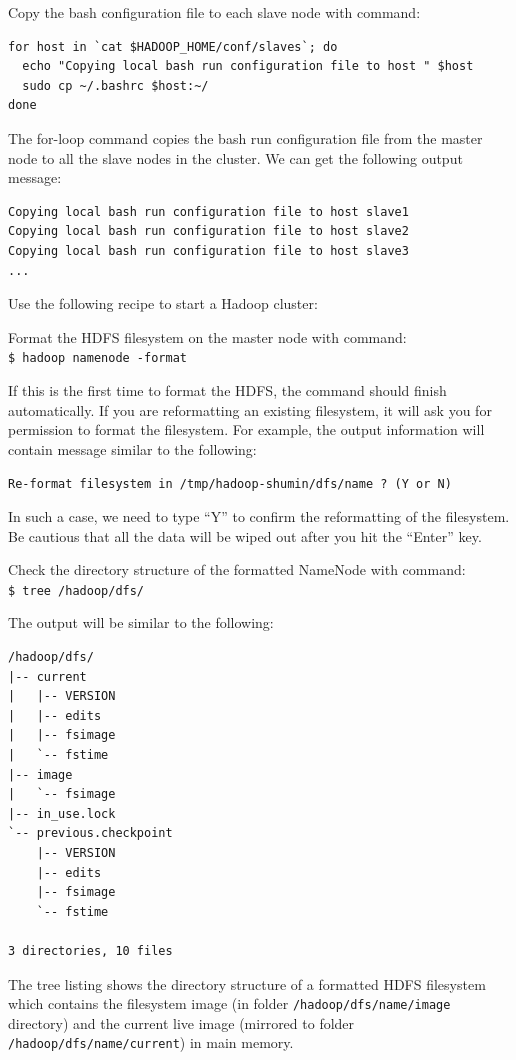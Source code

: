 Copy the bash configuration file to each slave node with command:
\lstset{style=bashstyle}
\begin{lstlisting}
for host in `cat $HADOOP_HOME/conf/slaves`; do
  echo "Copying local bash run configuration file to host " $host
  sudo cp ~/.bashrc $host:~/
done
\end{lstlisting}

The for-loop command copies the bash run configuration file from the master node to all the slave nodes in the cluster. We can get the following output message:
\lstset{style=bashstyle}
\begin{lstlisting}[caption=Output of the above command]
Copying local bash run configuration file to host slave1
Copying local bash run configuration file to host slave2
Copying local bash run configuration file to host slave3
...
\end{lstlisting}

Use the following recipe to start a Hadoop cluster:

Format the HDFS filesystem on the master node with command: \\
\verb|$ hadoop namenode -format|

If this is the first time to format the HDFS, the command should finish automatically. If you are reformatting an existing filesystem, it will ask you for permission to format the filesystem. For example, the output information will contain message similar to the following:

\verb|Re-format filesystem in /tmp/hadoop-shumin/dfs/name ? (Y or N)|

In such a case, we need to type ``Y'' to confirm the reformatting of the filesystem. Be cautious that all the data will be wiped out after you hit the ``Enter'' key.

Check the directory structure of the formatted NameNode with command: \\
\verb|$ tree /hadoop/dfs/|

The output will be similar to the following:
\lstset{style=bashstyle}
\begin{lstlisting}[caption=The directory tree structure of the NameNode]
/hadoop/dfs/
|-- current
|   |-- VERSION
|   |-- edits
|   |-- fsimage
|   `-- fstime
|-- image
|   `-- fsimage
|-- in_use.lock
`-- previous.checkpoint
    |-- VERSION
    |-- edits
    |-- fsimage
    `-- fstime

3 directories, 10 files
\end{lstlisting}

The tree listing shows the directory structure of a formatted HDFS filesystem which contains the filesystem image (in folder \verb|/hadoop/dfs/name/image| directory) and the current live image (mirrored to folder \verb|/hadoop/dfs/name/current|) in main memory.

